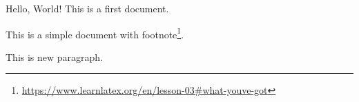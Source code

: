 \documentclass[a4paper, 12pt]{article} %
\begin{document}
Hello, World!
This is a first document.

This is     a simple
document with footnote\footnote{\url{https://www.learnlatex.org/en/lesson-03\#what-youve-got}}.



This is new paragraph.
\end{document}
